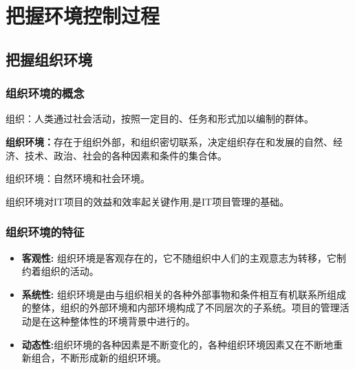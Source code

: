 \chapter{把握环境控制过程}
\section{把握组织环境}
\subsection{组织环境的概念}
组织：人类通过社会活动，按照一定目的、任务和形式加以编制的群体。
\par \textbf{组织环境：}存在于组织外部，和组织密切联系，决定组织存在和发展的自然、经济、技术、政治、社会的各种因素和条件的集合体。
\par 组织环境：自然环境和社会环境。
\par 组织环境对IT项目的效益和效率起关键作用,是IT项目管理的基础。
\subsection{组织环境的特征}
\begin{itemize}
	\item \textbf{客观性:} 组织环境是客观存在的，它不随组织中人们的主观意志为转移，它制约着组织的活动。
	\item \textbf{系统性: }组织环境是由与组织相关的各种外部事物和条件相互有机联系所组成的整体，组织的外部环境和内部环境构成了不同层次的子系统。项目的管理活动是在这种整体性的环境背景中进行的。
	\item \textbf{动态性:}组织环境的各种因素是不断变化的，各种组织环境因素又在不断地重新组合，不断形成新的组织环境。 
\end{itemize}
